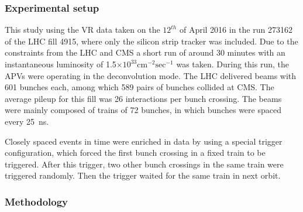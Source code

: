\subsubsection{Experimental setup} 

This study using the VR data taken on the $12^{th}$ of April 2016 in the run 273162 of the LHC fill 4915, where only the silicon strip tracker was included. Due to the constraints from the LHC and CMS a short run of around 30 minutes with an instantaneous luminosity of 1.5$\times 10^{33} \mathrm{cm^{-2} sec^{-1}}$ was taken. During this run, the APVs were operating in the deconvolution mode. The LHC delivered beams with 601 bunches each, among which 589 pairs of bunches collided at CMS. The average pileup for this fill was 26 interactions per bunch crossing. The beams were mainly composed of trains of 72 bunches, in which bunches were spaced every 25~ns.

Closely spaced events in time were enriched in data by using a special trigger configuration, which forced the first bunch crossing in a fixed train to be triggered. After this trigger, two other bunch crossings in the same train were triggered randomly. Then the trigger waited for the same train in next orbit. 





 \subsubsection{Methodology}
 

